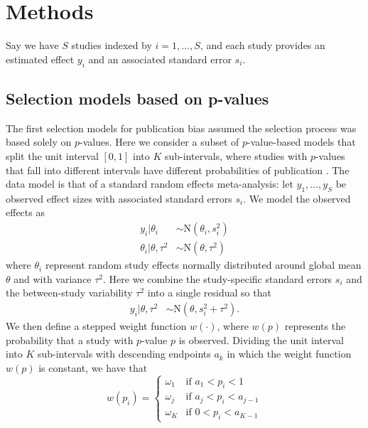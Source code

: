 \documentclass[12pt]{article}   	%
\numberwithin{equation}{section}
\begin{document}
\section{Methods} \label{sec:methods}

Say we have $S$ studies indexed by $i = 1, \dots, S$, and each study provides an estimated effect $y_i$ and an associated standard error $s_i$. 

\subsection{Selection models based on p-values} \label{sec:pvalue}

The first selection models for publication bias assumed the selection process was based solely on $p$-values. Here we consider a subset of $p$-value-based models that split the unit interval $[0, 1]$ into $K$ sub-intervals, where studies with $p$-values that fall into different intervals have different probabilities of publication \citep{hedges1992selection, vevea1995pubbias, vevea2005sensitivity}. The data model is that of a standard random effects meta-analysis: let $y_1, \dots, y_S$ be observed effect sizes with associated standard errors $s_i$.  We model the observed effects as
\begin{align}
y_i \vert \theta_i & \sim \mbox{N}(\theta_i, s_i ^ 2)  \label{eq:y} \\
\theta_i \vert \theta, \tau ^ 2 & \sim \mbox{N}(\theta, \tau ^ 2) \label{eq:thetai}
\end{align}
where $\theta_i$ represent random study effects normally distributed around global mean $\theta$ and with variance $\tau^2$. Here we combine the study-specific standard errors $s_i$ and the between-study variability $\tau^2$ into a single residual so that 
\begin{align}
y_i \vert \theta, \tau^2 &\sim \text{N}(\theta, s_i^2 + \tau^2).
\end{align}
We then define a stepped weight function $w(\cdot)$, where $w(p)$ represents the probability that a study with $p$-value $p$ is observed. Dividing the unit interval into $K$ sub-intervals with descending endpoints $a_k$ in which the weight function $w(p)$ is constant, we have that
\begin{equation} %
w(p_i) =
	\begin{cases}
		\omega_1 & \text{if $a_1 < p_i < 1$} \\
		\omega_j & \text{if $a_{j} < p_i < a_{j-1}$} \\
		\omega_K & \text{if $0 < p_i < a_{K-1}$}
	\end{cases} \label{eq:weight_fcn}
\end{equation}
\end{document}
